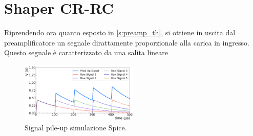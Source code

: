 \documentclass[a4paper,11pt]{article} %
\begin{document}

\section{Shaper CR-RC}\label{s:shaper} 

Riprendendo ora quanto esposto in \autoref{s:preamp_th}, si ottiene in uscita dal preamplificatore un segnale
dirattamente proporzionale alla carica in ingresso. Questo segnale è caratterizzato da una salita lineare 

\begin{figure}
	\centering
	\includegraphics[width=0.5\textwidth]{../Plots/PreAmp/signal_pileup.png}
	\vspace{-20pt}
	\caption{\small Signal pile-up simulazione Spice.}
	\label{i:preamp_pileup}
\end{figure}
\end{document}
